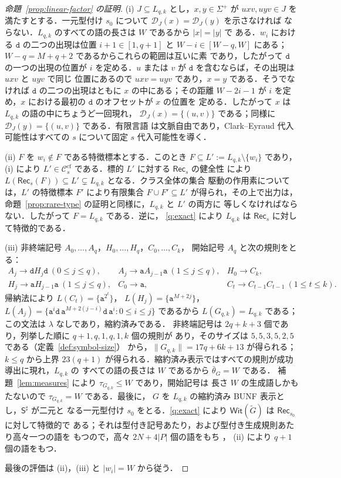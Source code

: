 \documentclass[11pt,a4paper]{ltjsarticle}
\numberwithin{equation}{section}
\theoremstyle{plain}
\theoremstyle{definition}
\theoremstyle{remark}
\theoremstyle{plain}
\newcommand{\cf}{\mathrm{cf}}
\newcommand{\Ccf}[1]{\mathcal C_{#1}^{\cf}}
\newcommand{\Rec}{\mathsf{Rec}}
\newcommand{\WitnessSet}{\mathsf{Wit}}
\newcommand{\D}{\mathcal{D}}
\begin{document}
\begin{proof}[命題~\ref{prop:linear-factor} の証明]
(i) $J\subseteq L_{q,k}$ とし，$x,y\in\Sigma^+$ が $uxv,uyv\in J$ を
満たすとする．一元型付け $s_0$ について $\D_J(x)=\D_J(y)$ を示さなければ
ならない．$L_{q,k}$ のすべての語の長さは $W$ であるから $|x|=|y|$ で
ある．$w_i$ における $\mathtt d$ の二つの出現は位置 $i+1\in[1,q+1]$ と
$W-i\in[W-q,W]$ にある；$W-q=M+q+2$ であるからこれらの範囲は互いに素
であり，したがって $\mathtt d$ の一つの出現の位置が $i$ を定める．$u$
または $v$ が $\mathtt d$ を含むならば，その出現は $uxv$ と $uyv$ で同じ
位置にあるので $uxv=uyv$ であり，$x=y$ である．そうでなければ
$\mathtt d$ の二つの出現はともに $x$ の中にある；その距離 $W-2i-1$ が
$i$ を定め，$x$ における最初の $\mathtt d$ のオフセットが $x$ の位置を
定める．したがって $x$ は $L_{q,k}$ の語の中にちょうど一回現れ，
$\D_J(x)=\{(u,v)\}$ である；同様に $\D_J(y)=\{(u,v)\}$ である．有限言語
は文脈自由であり，Clark--Eyraud 代入可能性はすべての $s$ について固定
$s$ 代入可能性を導く．

(ii) $F$ を $w_i\notin F$ である特徴標本とする．このとき
$F\subseteq L':=L_{q,k}\setminus\{w_i\}$ であり，(i) により
$L'\in\Ccf{s}$ である．標的 $L'$ に対する $\Rec_s$ の健全性
\cite[定理~4.2]{kuriyamaCFG} により
$L(\Rec_s(F))\subseteq L'\subsetneq L_{q,k}$ となる．クラス全体の集合
駆動の作用素については，$L'$ の特徴標本 $F'$ により有限集合
$F\cup F'\subseteq L'$ が得られ，その上で出力は，
命題~\ref{prop:rare-type} の証明と同様に，$L_{q,k}$ と $L'$ の両方に
等しくなければならない．したがって $F=L_{q,k}$ である．逆に，
\ref{q:exact} により $L_{q,k}$ は $\Rec_s$ に対して特徴的である．

(iii) 非終端記号 $A_0,\ldots,A_q$，$H_0,\ldots,H_q$，$C_0,\ldots,C_k$，
開始記号 $A_q$ と次の規則をとる：
\[
\begin{array}{lll}
 A_j\to\mathtt d H_j\mathtt d\ (0\le j\le q), &
 A_j\to\mathtt a A_{j-1}\mathtt a\ (1\le j\le q), &
 H_0\to C_k,\\
 H_j\to\mathtt a H_{j-1}\mathtt a\ (1\le j\le q), &
 C_0\to\mathtt a, &
 C_t\to C_{t-1}C_{t-1}\ (1\le t\le k).
\end{array}
\]
帰納法により $L(C_t)=\{\mathtt a^{2^t}\}$，
$L(H_j)=\{\mathtt a^{M+2j}\}$，
$L(A_j)=\{\mathtt a^i\mathtt d\,\mathtt a^{M+2(j-i)}\mathtt d\,\mathtt a^i:0\le i\le j\}$
であるから $L(G_{q,k})=L_{q,k}$ である；この文法は $\lambda$ なしであり，縮約済みである．
非終端記号は $2q+k+3$ 個であり，列挙した順に $q+1,q,1,q,1,k$ 個の規則が
あり，そのサイズは $5,5,3,5,2,5$ である（定義~\ref{def:symbol-size}）
から，$\|G_{q,k}\|=17q+6k+13$ が得られる；$k\le q$ から上界 $23(q+1)$
が得られる．縮約済み表示ではすべての規則が成功導出に現れ，$L_{q,k}$ の
すべての語の長さは $W$ であるから $\bar\theta_G=W$ である．
補題~\ref{lem:measures} により $\tau_{G_{q,k}}\le W$ であり，開始記号は
長さ $W$ の生成語しかもたないので $\tau_{G_{q,k}}=W$ である．最後に，
$G$ を $L_{q,k}$ の縮約済み BUNF 表示とし，$\mathsf S^\sharp$ が二元と
なる一元型付け $s_0$ をとる．\ref{q:exact} により
$\WitnessSet(\widetilde G)$ は $\Rec_{s_0}$ に対して特徴的で
ある；それは型付き記号あたり，および型付き生成規則あたり高々一つの語を
もつので，高々 $2N+4|P|$ 個の語をもち \cite[補題~6.2]{kuriyamaCFG}，
(ii) により $q+1$ 個の語をもつ．

最後の評価は (ii)，(iii) と $|w_i|=W$ から従う．
\end{proof}


\end{document}
